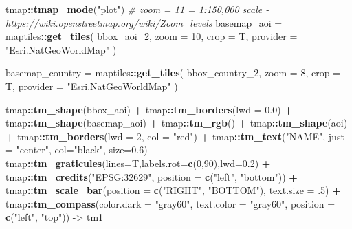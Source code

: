 \documentclass[
]{article}
\newenvironment{Shaded}{\begin{snugshade}}{\end{snugshade}}
\newcommand{\AttributeTok}[1]{\textcolor[rgb]{0.13,0.29,0.53}{#1}}
\newcommand{\CommentTok}[1]{\textcolor[rgb]{0.56,0.35,0.01}{\textit{#1}}}
\newcommand{\DecValTok}[1]{\textcolor[rgb]{0.00,0.00,0.81}{#1}}
\newcommand{\FloatTok}[1]{\textcolor[rgb]{0.00,0.00,0.81}{#1}}
\newcommand{\FunctionTok}[1]{\textcolor[rgb]{0.13,0.29,0.53}{\textbf{#1}}}
\newcommand{\NormalTok}[1]{#1}
\newcommand{\OtherTok}[1]{\textcolor[rgb]{0.56,0.35,0.01}{#1}}
\newcommand{\SpecialCharTok}[1]{\textcolor[rgb]{0.81,0.36,0.00}{\textbf{#1}}}
\newcommand{\StringTok}[1]{\textcolor[rgb]{0.31,0.60,0.02}{#1}}
\begin{document}
\begin{Shaded}
\begin{Highlighting}[]
\NormalTok{tmap}\SpecialCharTok{::}\FunctionTok{tmap\_mode}\NormalTok{(}\StringTok{"plot"}\NormalTok{)}
\CommentTok{\# zoom = 11 = 1:150,000 scale {-} https://wiki.openstreetmap.org/wiki/Zoom\_levels}
\NormalTok{basemap\_aoi }\OtherTok{=}\NormalTok{ maptiles}\SpecialCharTok{::}\FunctionTok{get\_tiles}\NormalTok{(}
\NormalTok{  bbox\_aoi\_2, }
  \AttributeTok{zoom      =} \DecValTok{10}\NormalTok{, }
  \AttributeTok{crop      =}\NormalTok{ T,}
  \AttributeTok{provider  =} \StringTok{"Esri.NatGeoWorldMap"}
\NormalTok{  )}

\NormalTok{basemap\_country }\OtherTok{=}\NormalTok{ maptiles}\SpecialCharTok{::}\FunctionTok{get\_tiles}\NormalTok{(}
\NormalTok{  bbox\_country\_2, }
  \AttributeTok{zoom      =} \DecValTok{8}\NormalTok{, }
  \AttributeTok{crop      =}\NormalTok{ T,}
  \AttributeTok{provider  =} \StringTok{"Esri.NatGeoWorldMap"}
\NormalTok{  )}

\NormalTok{tmap}\SpecialCharTok{::}\FunctionTok{tm\_shape}\NormalTok{(bbox\_aoi) }\SpecialCharTok{+}\NormalTok{ tmap}\SpecialCharTok{::}\FunctionTok{tm\_borders}\NormalTok{(}\AttributeTok{lwd =} \FloatTok{0.0}\NormalTok{) }\SpecialCharTok{+}
\NormalTok{  tmap}\SpecialCharTok{::}\FunctionTok{tm\_shape}\NormalTok{(basemap\_aoi) }\SpecialCharTok{+}\NormalTok{ tmap}\SpecialCharTok{::}\FunctionTok{tm\_rgb}\NormalTok{() }\SpecialCharTok{+} 
\NormalTok{  tmap}\SpecialCharTok{::}\FunctionTok{tm\_shape}\NormalTok{(aoi) }\SpecialCharTok{+}\NormalTok{ tmap}\SpecialCharTok{::}\FunctionTok{tm\_borders}\NormalTok{(}\AttributeTok{lwd =} \DecValTok{2}\NormalTok{, }\AttributeTok{col =} \StringTok{"red"}\NormalTok{) }\SpecialCharTok{+}
\NormalTok{  tmap}\SpecialCharTok{::}\FunctionTok{tm\_text}\NormalTok{(}\StringTok{"NAME"}\NormalTok{, }\AttributeTok{just =} \StringTok{"center"}\NormalTok{, }\AttributeTok{col=}\StringTok{"black"}\NormalTok{, }\AttributeTok{size=}\FloatTok{0.6}\NormalTok{) }\SpecialCharTok{+}
\NormalTok{  tmap}\SpecialCharTok{::}\FunctionTok{tm\_graticules}\NormalTok{(}\AttributeTok{lines=}\NormalTok{T,}\AttributeTok{labels.rot=}\FunctionTok{c}\NormalTok{(}\DecValTok{0}\NormalTok{,}\DecValTok{90}\NormalTok{),}\AttributeTok{lwd=}\FloatTok{0.2}\NormalTok{) }\SpecialCharTok{+}
\NormalTok{  tmap}\SpecialCharTok{::}\FunctionTok{tm\_credits}\NormalTok{(}\StringTok{"EPSG:32629"}\NormalTok{, }\AttributeTok{position =} \FunctionTok{c}\NormalTok{(}\StringTok{"left"}\NormalTok{, }\StringTok{"bottom"}\NormalTok{)) }\SpecialCharTok{+}
\NormalTok{  tmap}\SpecialCharTok{::}\FunctionTok{tm\_scale\_bar}\NormalTok{(}\AttributeTok{position =} \FunctionTok{c}\NormalTok{(}\StringTok{"RIGHT"}\NormalTok{, }\StringTok{"BOTTOM"}\NormalTok{), }\AttributeTok{text.size =}\NormalTok{ .}\DecValTok{5}\NormalTok{) }\SpecialCharTok{+} 
\NormalTok{  tmap}\SpecialCharTok{::}\FunctionTok{tm\_compass}\NormalTok{(}\AttributeTok{color.dark =} \StringTok{"gray60"}\NormalTok{, }\AttributeTok{text.color =} \StringTok{"gray60"}\NormalTok{, }\AttributeTok{position =} \FunctionTok{c}\NormalTok{(}\StringTok{"left"}\NormalTok{, }\StringTok{"top"}\NormalTok{)) }\OtherTok{{-}\textgreater{}}\NormalTok{ tm1}


\end{Highlighting}
\end{Shaded}
\end{document}
